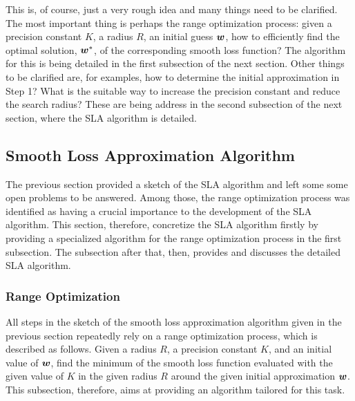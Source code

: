 This is, of course, just a very rough idea and many things need to be clarified. The most important thing is perhaps the range optimization process: given a precision constant $K$, a radius $R$, an initial guess $\boldsymbol{w}$, how to efficiently find the optimal solution, $\boldsymbol{w}^*$, of the corresponding smooth loss function? The algorithm for this is being detailed in the first subsection of the next section. Other things to be clarified are, for examples, how to determine the initial approximation in Step 1? What is the suitable way to increase the precision constant and reduce the search radius? These are being address in the second subsection of the next section, where the SLA algorithm is detailed. 

\subsection{Smooth Loss Approximation Algorithm}
\label{sec:sla.algorithm}

The previous section provided a sketch of the SLA algorithm and left some  some open problems to be answered. Among those, the range optimization process was identified as having a crucial importance to the  development of the SLA algorithm. This section, therefore, concretize the SLA algorithm firstly by providing a specialized algorithm for the range optimization process in the first subsection. The subsection after that, then, provides and discusses the detailed SLA algorithm.  

\subsubsection{Range Optimization}
\label{ssec:sla.range}

All steps in the sketch of the smooth loss approximation algorithm given in the previous section repeatedly rely on a range optimization process, which is described as follows. Given a radius $R$, a precision constant $K$, and an initial value of $\boldsymbol{w}$, find the minimum of the smooth loss function evaluated with the given value of $K$ in the given radius $R$ around the given initial approximation $\boldsymbol{w}$. This subsection, therefore, aims at providing an algorithm tailored for this task. 

